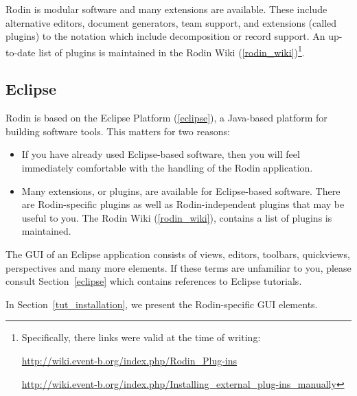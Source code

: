 Rodin is modular software and many extensions are available.  These include alternative editors, document generators, team support, and extensions (called plugins) to the notation which include decomposition or record support.  An up-to-date list of plugins is maintained in the Rodin Wiki (\ref{rodin_wiki})\footnote{Specifically, there links were valid at the time of writing:

\url{http://wiki.event-b.org/index.php/Rodin_Plug-ins}

\url{http://wiki.event-b.org/index.php/Installing_external_plug-ins_manually}}.

\subsection{Eclipse} 
\label{tut_eclipse}

Rodin is based on the Eclipse Platform (\ref{eclipse}), a Java-based platform for building software tools.  This matters for two reasons:
\begin{itemize}
	\item If you have already used Eclipse-based software, then you will feel immediately comfortable with the handling of the Rodin application.
	\item Many extensions, or plugins, are available for Eclipse-based software. There are Rodin-specific plugins as well as Rodin-independent plugins that may be useful to you.  The Rodin Wiki (\ref{rodin_wiki}), contains a list of plugins is maintained.
\end{itemize}

The GUI of an Eclipse application consists of views, editors, toolbars, quickviews, perspectives and many more elements.  If these terms are unfamiliar to you, please consult Section~\ref{eclipse} which contains references to Eclipse tutorials.

In Section~\ref{tut_installation}, we present the Rodin-specific GUI elements.

